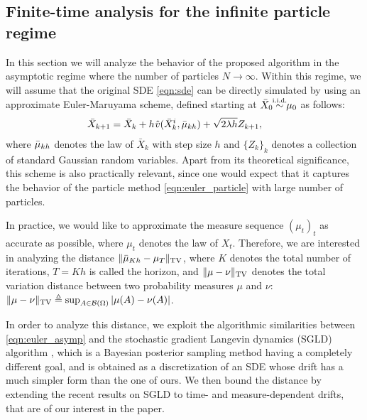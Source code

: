 
\subsection{Finite-time analysis for the infinite particle regime}
%
In this section we will analyze the behavior of the proposed algorithm in the asymptotic regime where the number of particles $N \rightarrow \infty$. Within this regime, we will assume that the original SDE \eqref{eqn:sde} can be directly simulated by using an approximate Euler-Maruyama scheme, defined starting at $\bar{X}_0 \simiid \mu_0$ as follows:
\begin{align}
 \bar{X}_{k+1} = \bar{X}_k + h \hspace{0.5pt} \hat{v}(\bar{X}^i_k, \bar{\mu}_{kh} ) + \sqrt{2 \lambda h} Z_{k+1}, \qquad \label{eqn:euler_asymp}
\end{align}
where $\bar{\mu}_{kh}$ denotes the law of $\bar{X}_k$ with step size $h$ and $\{Z_k\}_{k}$ denotes a collection of standard Gaussian random variables. Apart from its theoretical significance, this scheme is also practically relevant, since one would expect that it captures the behavior of the particle method \eqref{eqn:euler_particle} with large number of particles. 

In practice, we would like to approximate the measure sequence $(\mu_t)_t$ as accurate as possible, where $\mu_t$ denotes the law of $X_t$. Therefore, we are interested in analyzing the distance $\| \bar{\mu}_{Kh} - \mu_{T} \|_{\textnormal{TV}}$, where $K$ denotes the total number of iterations, $T=Kh$ is called the horizon, and $\|\mu-\nu\|_{\textnormal{TV}}$ denotes the total variation distance between two probability measures $\mu$ and $\nu$: $\|\mu-\nu\|_{\textnormal{TV}}\triangleq \sup_{A \in {\cal B}(\Omega)} |\mu(A) -\nu(A) |$. 
%

In order to analyze this distance, we exploit the algorithmic similarities between \eqref{eqn:euler_asymp} and the stochastic gradient Langevin dynamics (SGLD) algorithm \cite{WelTeh2011a}, which is a Bayesian posterior sampling method having a completely different goal, and is obtained as a discretization of an SDE whose drift has a much simpler form than the one of ours. We then bound the distance by extending the recent results on SGLD \cite{raginsky17a} to time- and measure-dependent drifts, that are of our interest in the paper.

